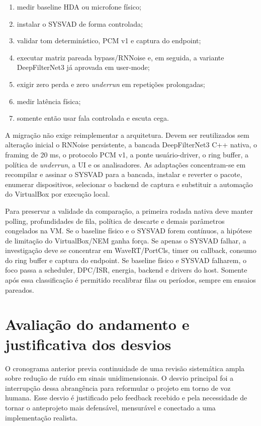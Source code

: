 \begin{enumerate}
    \item medir baseline HDA ou microfone físico;
    \item instalar o SYSVAD de forma controlada;
    \item validar tom determinístico, PCM v1 e captura do endpoint;
    \item executar matriz pareada bypass/RNNoise e, em seguida, a variante DeepFilterNet3 já aprovada em user-mode;
    \item exigir zero perda e zero \textit{underrun} em repetições prolongadas;
    \item medir latência física;
    \item somente então usar fala controlada e escuta cega.
\end{enumerate}

A migração não exige reimplementar a arquitetura. Devem ser reutilizados sem alteração inicial o RNNoise persistente, a bancada DeepFilterNet3 C++ nativa, o framing de 20 ms, o protocolo PCM v1, a ponte usuário-driver, o ring buffer, a política de \textit{underrun}, a UI e os analisadores. As adaptações concentram-se em recompilar e assinar o SYSVAD para a bancada, instalar e reverter o pacote, enumerar dispositivos, selecionar o backend de captura e substituir a automação do VirtualBox por execução local.

Para preservar a validade da comparação, a primeira rodada nativa deve manter polling, profundidades de fila, política de descarte e demais parâmetros congelados na VM. Se o baseline físico e o SYSVAD forem contínuos, a hipótese de limitação do VirtualBox/NEM ganha força. Se apenas o SYSVAD falhar, a investigação deve se concentrar em WaveRT/PortCls, timer ou callback, consumo do ring buffer e captura do endpoint. Se baseline físico e SYSVAD falharem, o foco passa a scheduler, DPC/ISR, energia, backend e drivers do host. Somente após essa classificação é permitido recalibrar filas ou períodos, sempre em ensaios pareados.

\section{Avaliação do andamento e justificativa dos desvios}

O cronograma anterior previa continuidade de uma revisão sistemática ampla sobre redução de ruído em sinais unidimensionais. O desvio principal foi a interrupção dessa abrangência para reformular o projeto em torno de voz humana. Esse desvio é justificado pelo feedback recebido e pela necessidade de tornar o anteprojeto mais defensável, mensurável e conectado a uma implementação realista.

